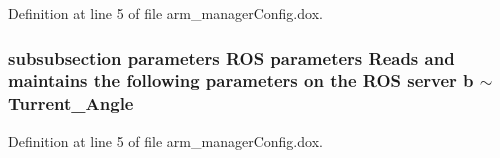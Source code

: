\-Definition at line 5 of file arm\-\_\-manager\-Config.\-dox.

\subsubsection[{$\sim$\-Turrent\-\_\-\-Angle}]{\setlength{\rightskip}{0pt plus 5cm}subsubsection parameters \-R\-O\-S parameters \-Reads and maintains the following parameters on the \-R\-O\-S server b $\sim$\-Turrent\-\_\-\-Angle}\label{arm__managerConfig_8dox_a352c674a5ebbd6ad6e64cff4f9b18049}


\-Definition at line 5 of file arm\-\_\-manager\-Config.\-dox.

